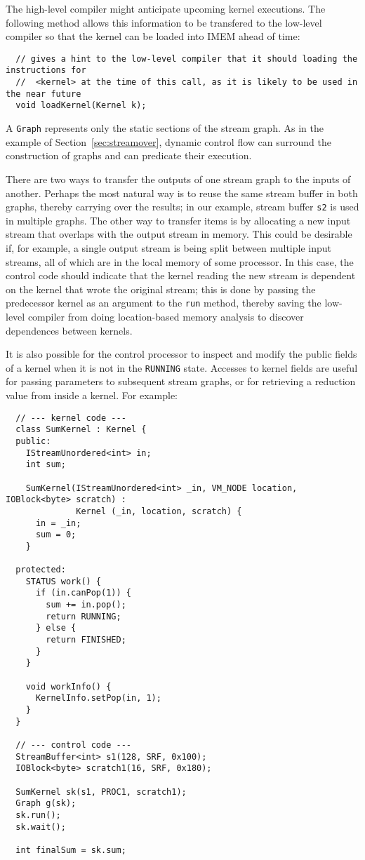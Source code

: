 The high-level compiler might anticipate upcoming kernel executions.
The following method allows this information to be transfered to the
low-level compiler so that the kernel can be loaded into IMEM ahead of
time:
\begin{verbatim}
  // gives a hint to the low-level compiler that it should loading the instructions for
  //  <kernel> at the time of this call, as it is likely to be used in the near future
  void loadKernel(Kernel k);
\end{verbatim}


A {\tt Graph} represents only the static sections of the stream graph.
As in the example of Section~\ref{sec:streamover}, dynamic control
flow can surround the construction of graphs and can predicate their
execution.

There are two ways to transfer the outputs of one stream graph to the
inputs of another.  Perhaps the most natural way is to reuse the same
stream buffer in both graphs, thereby carrying over the results; in
our example, stream buffer {\tt s2} is used in multiple graphs.  The
other way to transfer items is by allocating a new input stream that
overlaps with the output stream in memory.  This could be desirable
if, for example, a single output stream is being split between
multiple input streams, all of which are in the local memory of some
processor.  In this case, the control code should indicate that the
kernel reading the new stream is dependent on the kernel that wrote
the original stream; this is done by passing the predecessor kernel as
an argument to the {\tt run} method, thereby saving the low-level
compiler from doing location-based memory analysis to discover
dependences between kernels.

It is also possible for the control processor to inspect and modify
the public fields of a kernel when it is not in the {\tt RUNNING}
state.  Accesses to kernel fields are useful for passing parameters to
subsequent stream graphs, or for retrieving a reduction value from
inside a kernel.  For example: 
{\small
\begin{verbatim}
  // --- kernel code ---
  class SumKernel : Kernel {
  public:
    IStreamUnordered<int> in;
    int sum;

    SumKernel(IStreamUnordered<int> _in, VM_NODE location, IOBlock<byte> scratch) : 
              Kernel (_in, location, scratch) {
      in = _in;
      sum = 0;
    }

  protected:
    STATUS work() {
      if (in.canPop(1)) {
        sum += in.pop();
        return RUNNING;
      } else {
        return FINISHED;
      }
    }

    void workInfo() {
      KernelInfo.setPop(in, 1);
    }
  }

  // --- control code ---
  StreamBuffer<int> s1(128, SRF, 0x100);
  IOBlock<byte> scratch1(16, SRF, 0x180);

  SumKernel sk(s1, PROC1, scratch1);
  Graph g(sk);
  sk.run();
  sk.wait();

  int finalSum = sk.sum;
\end{verbatim}}

